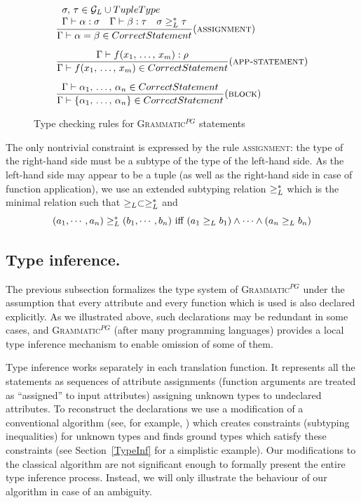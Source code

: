 \documentclass{informat} %
\newcommand{\secref}[1]{Section~\ref{#1}}
\newcommand{\ATF}{\textsc{Grammatic}$^{PG}$}
\begin{document}
\begin{figure}[htbp]
$$
\begin{array}{l}
\trule{
\begin{array}{l}
\sigma,\,\tau \in \G \cup \TUP
\\
\Gamma \vdash \alpha : \sigma 
\quad 
\Gamma \vdash \beta : \tau 
\quad 
\sigma \gel^* \tau
\end{array}
}{\Gamma \vdash \alpha = \beta \in CorrectStatement}{assignment}
\vspace{10pt}
\\
\trule{
\Gamma \vdash f(x_1,\,\ldots,\,x_m) : \rho
}{
\Gamma \vdash f(x_1,\,\ldots,\,x_m) \in CorrectStatement
}{app-statement}
\vspace{10pt}
\\
\trule{
\Gamma \vdash \alpha_1,\,\ldots,\,\alpha_n \in CorrectStatement
}{\Gamma \vdash \left\{ \alpha_1,\,\ldots,\,\alpha_n \right\} \in CorrectStatement}{block}
\end{array}
$$
\caption{Type checking rules for \ATF{} statements}\label{statypes}
\end{figure}

The only nontrivial constraint is expressed by the rule \textsc{assignment}: the type of the right-hand side must be a subtype of the type of the left-hand side. As the left-hand side may appear to be a tuple (as well as the right-hand side in case of function application), we use an extended subtyping relation $\ge_L^*$ which is the minimal relation such that $\ge_L \subset \ge_L^*$ and
$$(a_1,\cdots,a_n)\ge_L^*(b_1,\cdots,b_n)\mbox{ iff } (a_1 \ge_L b_1) \wedge \cdots \wedge (a_n \ge_L b_n)$$


\subsection{Type inference.}\label{TypeInference}

The previous subsection formalizes the type system of \ATF{} under the assumption that every attribute and every function which is used is also declared explicitly. As we illustrated above, such declarations may be redundant in some cases, and \ATF{} (after many programming languages) provides a local type inference mechanism to enable omission of some of them.  

Type inference works separately in each translation function. It represents all the statements as sequences of attribute assignments (function arguments are treated as ``assigned'' to input attributes) assigning unknown types to undeclared attributes. To reconstruct the declarations we use a modification of a conventional algorithm (see, for example, \cite{Pierce}) which creates constraints (subtyping inequalities) for unknown types and finds ground types which satisfy these constraints (see \secref{TypeInf} for a simplistic example). Our modifications to the classical algorithm are not significant enough to formally present the entire type inference process. Instead, we will only illustrate the behaviour of our algorithm in case of an ambiguity.
\end{document}
